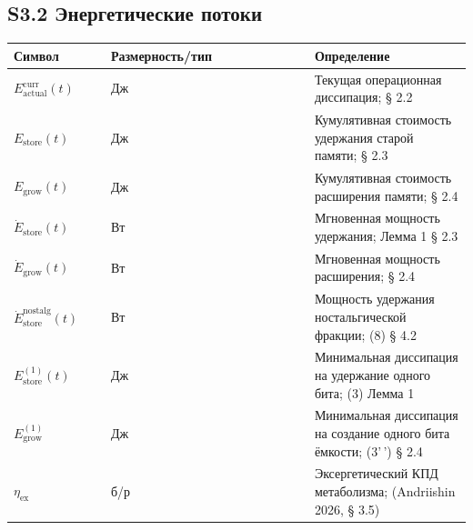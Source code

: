 \documentclass[pdflatex,sn-mathphys-ay]{sn-jnl}
\begin{document}
\subsection*{S3.2 Энергетические потоки}\label{s3.2-ux44dux43dux435ux440ux433ux435ux442ux438ux447ux435ux441ux43aux438ux435-ux43fux43eux442ux43eux43aux438}



\begin{center}\small
\begin{tabular}{@{} >{\raggedright\arraybackslash}p{0.2105\linewidth} >{\raggedright\arraybackslash}p{0.4474\linewidth} >{\raggedright\arraybackslash}p{0.3421\linewidth}@{}}
\toprule

\begin{minipage}[b]{\linewidth}\raggedright

Символ

\end{minipage} & \begin{minipage}[b]{\linewidth}\raggedright

Размерность/тип

\end{minipage} & \begin{minipage}[b]{\linewidth}\raggedright

Определение

\end{minipage} \\

\midrule

\(E_{\text{actual}}^{\text{curr}}(t)\) & Дж & Текущая операционная диссипация; § 2.2 \\

\(E_{\text{store}}(t)\) & Дж & Кумулятивная стоимость удержания старой памяти; § 2.3 \\

\(E_{\text{grow}}(t)\) & Дж & Кумулятивная стоимость расширения памяти; § 2.4 \\

\(\dot{E}_{\text{store}}(t)\) & Вт & Мгновенная мощность удержания; Лемма 1 § 2.3 \\

\(\dot{E}_{\text{grow}}(t)\) & Вт & Мгновенная мощность расширения; § 2.4 \\

\(\dot{E}_{\text{store}}^{\text{nostalg}}(t)\) & Вт & Мощность удержания ностальгической фракции; (8) § 4.2 \\

\(E_{\text{store}}^{(1)}(t)\) & Дж & Минимальная диссипация на удержание одного бита; (3) Лемма 1 \\

\(E_{\text{grow}}^{(1)}\) & Дж & Минимальная диссипация на создание одного бита ёмкости; (3'\,') § 2.4 \\

\(\eta_{\text{ex}}\) & б/р & Эксергетический КПД метаболизма; (Andriishin 2026, § 3.5) \\

\bottomrule
\end{tabular}
\end{center}
\end{document}
